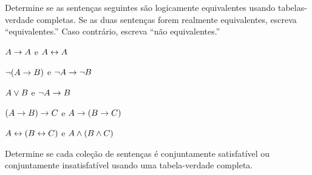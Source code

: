 \problempart
\label{pr.TT.equiv2}
Determine se as sentenças seguintes são logicamente equivalentes usando tabelas-verdade completas. Se as duas sentenças forem realmente equivalentes, escreva ``equivalentes.'' Caso contrário, escreva ``não equivalentes.''
\begin{compactlist}
\item $A\rightarrow A$ e $A \leftrightarrow A$
\item $\neg(A \rightarrow B)$ e $\neg A \rightarrow \neg B$
\item $A \vee B$ e $\neg A \rightarrow B$
\item$(A \rightarrow B) \rightarrow C$ e $A \rightarrow (B \rightarrow C)$
\item $A \leftrightarrow (B \leftrightarrow C)$ e $A \wedge (B \wedge C)$
\end{compactlist}


\problempart
\label{pr.TT.satisfiable2}
Determine se cada coleção de sentenças é conjuntamente satisfatível ou conjuntamente insatisfatível usando uma tabela-verdade completa.
